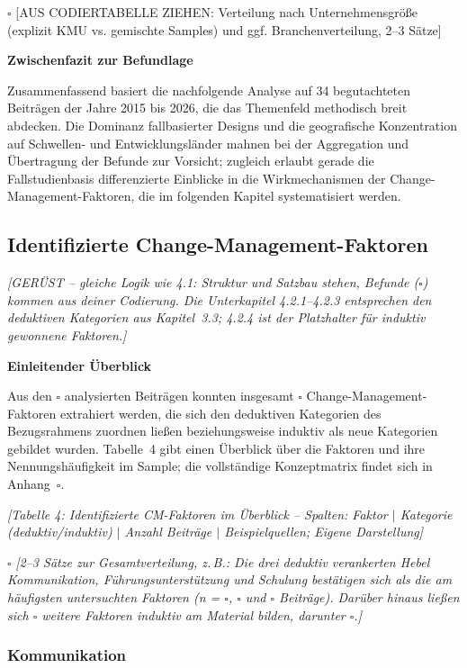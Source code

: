 $\square$ [AUS CODIERTABELLE ZIEHEN: Verteilung nach Unternehmensgr\"o\ss{}e (explizit KMU vs. gemischte Samples) und ggf. Branchenverteilung, 2--3 S\"atze]

\textbf{Zwischenfazit zur Befundlage}

Zusammenfassend basiert die nachfolgende Analyse auf 34 begutachteten Beitr\"agen der Jahre 2015 bis 2026, die das Themenfeld methodisch breit abdecken. Die Dominanz fallbasierter Designs und die geografische Konzentration auf Schwellen- und Entwicklungsl\"ander mahnen bei der Aggregation und \"Ubertragung der Befunde zur Vorsicht; zugleich erlaubt gerade die Fallstudienbasis differenzierte Einblicke in die Wirkmechanismen der Change-Management-Faktoren, die im folgenden Kapitel systematisiert werden.

\subsection{Identifizierte Change-Management-Faktoren}

\textit{[GER\"UST -- gleiche Logik wie 4.1: Struktur und Satzbau stehen, Befunde ($\square$) kommen aus deiner Codierung. Die Unterkapitel 4.2.1--4.2.3 entsprechen den deduktiven Kategorien aus Kapitel~3.3; 4.2.4 ist der Platzhalter f\"ur induktiv gewonnene Faktoren.]}

\textbf{Einleitender \"Uberblick}

Aus den $\square$ analysierten Beitr\"agen konnten insgesamt $\square$ Change-Management-Faktoren extrahiert werden, die sich den deduktiven Kategorien des Bezugsrahmens zuordnen lie\ss{}en beziehungsweise induktiv als neue Kategorien gebildet wurden. Tabelle~4 gibt einen \"Uberblick \"uber die Faktoren und ihre Nennungsh\"aufigkeit im Sample; die vollst\"andige Konzeptmatrix findet sich in Anhang~$\square$.

\textit{[Tabelle 4: Identifizierte CM-Faktoren im \"Uberblick -- Spalten: Faktor $\mid$ Kategorie (deduktiv/induktiv) $\mid$ Anzahl Beitr\"age $\mid$ Beispielquellen; Eigene Darstellung]}

$\square$ \textit{[2--3 S\"atze zur Gesamtverteilung, z.\,B.: Die drei deduktiv verankerten Hebel Kommunikation, F\"uhrungsunterst\"utzung und Schulung best\"atigen sich als die am h\"aufigsten untersuchten Faktoren (n = $\square$, $\square$ und $\square$ Beitr\"age). Dar\"uber hinaus lie\ss{}en sich $\square$ weitere Faktoren induktiv am Material bilden, darunter $\square$.]}

\subsubsection{Kommunikation}

